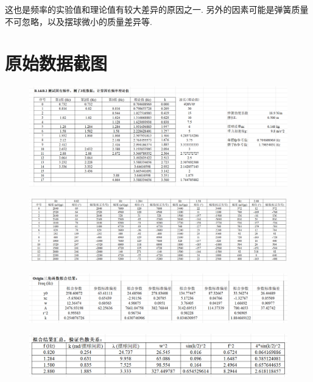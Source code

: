 \documentclass{customDoc}
\begin{document}
这也是频率的实验值和理论值有较大差异的原因之一. 另外的因素可能是弹簧质量不可忽略，以及摆球微小的质量差异等.

\section{原始数据截图}

\begin{figure}[H]
  \centering
  \includegraphics[width=\textwidth]{originData-1.png}
\end{figure}

\begin{figure}[H]
  \centering
  \includegraphics[width=\textwidth]{originData-2.png}
\end{figure}

\begin{figure}[H]
  \centering
  \includegraphics[width=\textwidth]{originData-3.png}
\end{figure}

\begin{figure}[H]
  \centering
  \includegraphics[width=\textwidth]{originData-4.png}
\end{figure}
\end{document}

